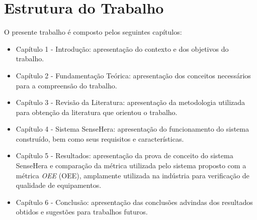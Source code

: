 \section{Estrutura do Trabalho}
\null \quad O presente trabalho é composto pelos seguintes capítulos:
\begin{itemize}
  \item Capítulo 1 - Introdução: apresentação do contexto e dos objetivos do trabalho.
  \item Capítulo 2 - Fundamentação Teórica: apresentação dos conceitos necessários para a compreensão do
  trabalho.
  \item Capítulo 3 - Revisão da Literatura: apresentação da metodologia utilizada para obtenção da literatura que orientou o trabalho.
  \item Capítulo 4 - Sistema SenseHera: apresentação do funcionamento do sistema construído, bem como seus requisitos e características.
  \item Capítulo 5 - Resultados: apresentação da prova de conceito do sistema SenseHera e comparação da métrica utilizada pelo sistema proposto com a métrica \textit{\acrlong{OEE}} (\acrshort{OEE}), amplamente utilizada na indústria para verificação de qualidade de equipamentos.
  \item Capítulo 6 - Conclusão: apresentação das conclusões advindas dos resultados obtidos e
  sugestões para trabalhos futuros.
\end{itemize}
